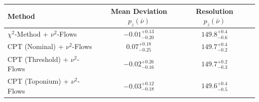     \begin{tabular}{lccc}
        \toprule
        Method & Mean Deviation $p_{z}(\bar{\nu})$ & Resolution $p_{z}(\bar{\nu})$ \\
        \midrule
        $\chi^2$-Method + $\nu^2$-Flows & $-0.01^{+0.13}_{-0.20}$ & $149.8^{+0.4}_{-0.6}$ \\
        CPT (Nominal) + $\nu^2$-Flows & $0.07^{+0.18}_{-0.25}$ & $149.7^{+0.4}_{-0.2}$ \\
        CPT (Threshold) + $\nu^2$-Flows & $-0.02^{+0.26}_{-0.16}$ & $149.7^{+0.2}_{-0.3}$ \\
        CPT (Toponium) + $\nu^2$-Flows & $-0.03^{+0.12}_{-0.18}$ & $149.6^{+0.4}_{-0.5}$ \\
        \bottomrule
    \end{tabular}